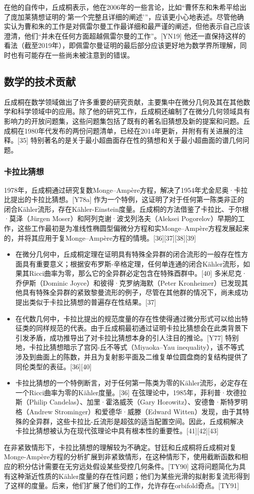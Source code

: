 在他的自传中，丘成桐表示，他在2006年的一些言论，比如“曹怀东和朱希平给出了庞加莱猜想证明的‘第一个完整且详细的阐述’”，应该更小心地表述。尽管他确实认为曹和朱的工作是对佩雷尔曼工作最详细和最严谨的阐述，但他表示自己应该澄清，他们“并未在任何方面超越佩雷尔曼的工作”。[YN19] 他还一直保持这样的看法（截至2019年），即佩雷尔曼证明的最后部分应该更好地为数学界所理解，同时也有可能存在一些尚未被注意到的错误。
\subsection{数学的技术贡献}
丘成桐在数学领域做出了许多重要的研究贡献，主要集中在微分几何及其在其他数学和科学领域中的应用。除了他的研究工作，丘成桐还编制了在微分几何领域具有影响力的开放问题集，这些问题集包括了既有的著名旧猜想及新的提案和问题。丘成桐在1980年代发布的两份问题清单，已经在2014年更新，并附有有关进展的注释。[35] 特别著名的是关于最小超曲面存在性的猜想和关于最小超曲面的谱几何问题。
\subsubsection{卡拉比猜想}
1978年，丘成桐通过研究复数Monge–Ampère方程，解决了1954年尤金尼奥·卡拉比提出的卡拉比猜想。[Y78a] 作为一个特例，这证明了对于任何第一陈类非正的闭合Kähler流形，存在Kähler-Einstein度量。丘成桐的方法借鉴了卡拉比、于尔根·莫泽（Jürgen Moser）和阿列克谢·波戈列洛夫（Aleksei Pogorelov）早期的工作，这些工作最初是为准线性椭圆型偏微分方程和实Monge–Ampère方程发展起来的，并将其应用于复Monge–Ampère方程的情境。[36][37][38][39]
\begin{itemize}
\item 在微分几何中，丘成桐定理在证明具有特殊全异群的闭合流形的一般存在性方面具有重要意义；根据安布罗斯-辛格定理，任何单连通的闭合Kähler流形，如果其Ricci曲率为零，那么它的全异群必定包含在特殊酉群中。[40] 多米尼克·乔伊斯（Dominic Joyce）和彼得·克罗纳海默（Peter Kronheimer）已发现其他具有特殊全异群的紧致黎曼流形的例子，尽管在其他群的情况下，尚未成功提出类似于卡拉比猜想的普遍存在性结果。[37]  
\item 在代数几何中，卡拉比提出的规范度量的存在性使得通过微分形式可以给出特征类的同样规范的代表。由于丘成桐最初通过证明卡拉比猜想会在此类背景下引发矛盾，成功推导出了对卡拉比猜想本身的引人注目的推论。[Y77] 特别地，卡拉比猜想暗示了宫冈-丘不等式（Miyaoka–Yau inequality），该不等式涉及到曲面上的陈数，并且为复射影平面及二维复单位圆盘商的复结构提供了同伦类型的表征。[36][40]  
\item 卡拉比猜想的一个特例断言，对于任何第一陈类为零的Kähler流形，必定存在一个Ricci曲率为零的Kähler度量。[36] 在弦理论中，1985年，菲利普·坎德拉斯（Philip Candelas）、加里·霍洛威茨（Gary Horowitz）、安德鲁·斯特罗明格（Andrew Strominger）和爱德华·威滕（Edward Witten）发现，由于其特殊的全异群，这些卡拉比-丘流形是超弦的适当配置空间。因此，丘成桐解决卡拉比猜想被认为在现代弦理论中具有根本性的重要性。[41][42][43]
\end{itemize}
在非紧致情形下，卡拉比猜想的理解较为不确定。甘廷和丘成桐将丘成桐对复Monge-Ampère方程的分析扩展到非紧致情形，在这种情形下，使用截断函数和相应的积分估计需要在无穷远处假设某些受控几何条件。[TY90] 这将问题简化为具有这种渐近性质的Kähler度量的存在性问题；他们为某些光滑的拟射影复流形得到了这样的度量。后来，他们扩展了他们的工作，允许存在orbifold奇点。[TY91]  

